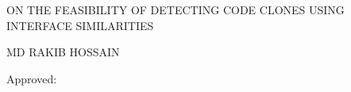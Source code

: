 \begin{center}


{ ON THE FEASIBILITY OF DETECTING CODE CLONES USING INTERFACE SIMILARITIES}
\vspace{5mm}

{ MD RAKIB HOSSAIN}

\end{center}

\vspace{0.5cm}

Approved: 

\vspace{0.5cm}

